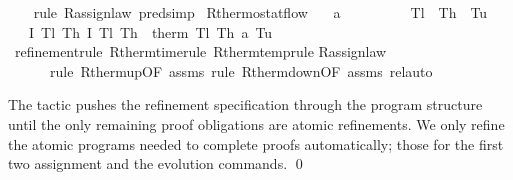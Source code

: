 \documentclass[envcountsame,envcountsect]{llncs}
\begin{document}
\begin{example}
\begin{isabellebody}
\ \ \isamarkupfalse%
\ {\isacharparenleft}rule\ R{\isacharunderscore}assign{\isacharunderscore}law{\isacharcomma}\ pred{\isacharunderscore}simp{\isacharparenright}%
\isanewline
\isanewline
{}\isamarkupfalse%
\ R{\isacharunderscore}thermostat{\isacharunderscore}flow{\isacharcolon}\isanewline
\ \ \ {\isachardoublequoteopen}a\ {\isachargreater}\ {}{\isachardoublequoteclose}\ \ {\isachardoublequoteopen}{}\ {\isasymle}\ {\isasymtau}{\isachardoublequoteclose}\ \ {\isachardoublequoteopen}{}\ {\isacharless}\ T\isactrlsub l{\isachardoublequoteclose}\ \ {\isachardoublequoteopen}T\isactrlsub h\ {\isacharless}\ T\isactrlsub u{\isachardoublequoteclose}\isanewline
\ \ \ {\isachardoublequoteopen}\isactrlbold {\isacharbrackleft}I\ T\isactrlsub l\ T\isactrlsub h{\isacharcomma}\ I\ T\isactrlsub l\ T\isactrlsub h\isactrlbold {\isacharbrackright}\ {\isasymge}\ therm\ T\isactrlsub l\ T\isactrlsub h\ a\ T\isactrlsub u\ {\isasymtau}{\isachardoublequoteclose}\isanewline
\ \ \isamarkupfalse%
\ {\isacharparenleft}refinement{\isacharsemicolon}{\isacharparenleft}rule\ R{\isacharunderscore}therm{\isacharunderscore}time{\isacharparenright}{\isacharquery}{\isacharcomma}{\isacharparenleft}rule\ R{\isacharunderscore}therm{\isacharunderscore}temp{\isacharparenright}{\isacharquery}{\isacharcomma}{\isacharparenleft}rule R{\isacharunderscore}assign{\isacharunderscore}law{\isacharparenright}{\isacharquery}{\isacharcomma} \isanewline
\ \ \ \ \ \ {\isacharparenleft}rule\ R{\isacharunderscore}therm{\isacharunderscore}up{\isacharbrackleft}OF\ assms{\isacharbrackright}{\isacharparenright}{\isacharquery}{\isacharcomma}\ {\isacharparenleft}rule\ R{\isacharunderscore}therm{\isacharunderscore}down{\isacharbrackleft}OF\ assms{\isacharbrackright}{\isacharparenright}{\isacharquery}{\isacharparenright}\ rel{\isacharunderscore}auto{\isacharprime}
\isanewline
\end{isabellebody}
The  tactic pushes the refinement specification
through the program structure until the only remaining proof
obligations are atomic refinements. We only refine the atomic programs
needed to complete proofs automatically; 
those for the first two assignment and the evolution commands. \qed
\end{example}
\end{document}
